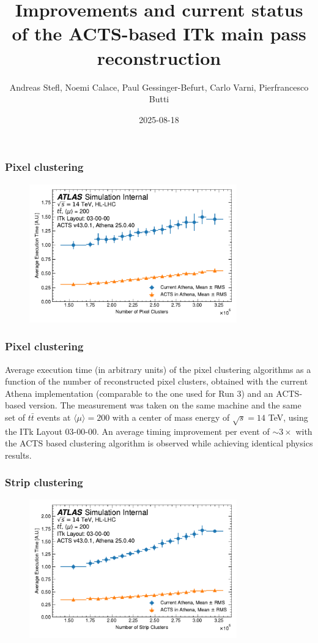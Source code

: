 \documentclass[aspectratio=169]{beamer}
\title{Improvements and current status of the ACTS-based ITk main pass reconstruction}
\author{Andreas Stefl, Noemi Calace, Paul Gessinger-Befurt, Carlo Varni, Pierfrancesco Butti}
\institute{CERN}
\date{2025-08-18}
\begin{document}
\frame{\titlepage}

\begin{frame}
\frametitle{Pixel clustering}
\begin{figure}[h]
    \centering
    \includegraphics[width=0.8\textwidth]{plots/clustering_pixel.pdf}
\end{figure}
\end{frame}

\begin{frame}
\frametitle{Pixel clustering}
Average execution time (in arbitrary units) of the pixel clustering algorithms as a function of the number of reconstructed pixel clusters, obtained with the current Athena implementation (comparable to the one used for Run 3) and an ACTS-based version. The measurement was taken on the same machine and the same set of $t\bar{t}$ events at $\langle \mu \rangle = 200$ with a center of mass energy of $\sqrt{s}=14$ TeV, using the ITk Layout 03-00-00. An average timing improvement per event of $\sim3\times$ with the ACTS based clustering algorithm is observed while achieving identical physics results.
\end{frame}

\begin{frame}
\frametitle{Strip clustering}
\begin{figure}[h]
    \centering
    \includegraphics[width=0.8\textwidth]{plots/clustering_strip.pdf}
\end{figure}
\end{frame}
\end{document}
